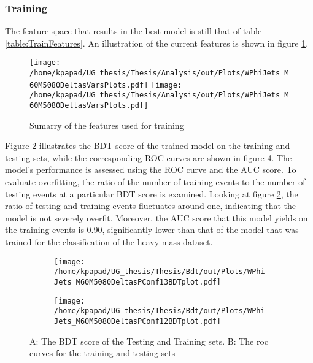 \subsubsection{Training}
\label{sec:org7ed8c8f}
\label{sec:Light:Training}
The feature space that results in the best model is still that of table \ref{table:TrainFeatures}. An illustration of the current features is shown in figure \ref{fig:LightFeatures}.
\begin{figure}[h]
\centering
\texttt{[image: /home/kpapad/UG\_thesis/Thesis/Analysis/out/Plots/WPhiJets\_M60M5080DeltasVarsPlots.pdf]}
\texttt{[image: /home/kpapad/UG\_thesis/Thesis/Analysis/out/Plots/WPhiJets\_M60M5080DeltasVarsPlots.pdf]}
\caption{Sumarry of the features used for training }
\label{fig:LightFeatures}
\end{figure}

Figure \ref{subfig:LightBdtPlot} illustrates the BDT score of the trained model on the training and testing sets, while the corresponding ROC curves are shown in figure \ref{subfig:LightROCCurves}. The model's performance is assessed using the ROC curve and the AUC score. To evaluate overfitting, the ratio of the number of training events to the number of testing events at a particular BDT score is examined. Looking at figure \ref{subfig:LightBdtPlot}, the ratio of testing and training events fluctuates around one, indicating that the model is not severely overfit. Moreover, the AUC score that this model yields on the training events is 0.90, significantly lower than that of the model that was trained for the classification of the heavy mass dataset.
\begin{figure}[h]
\centering
\begin{subfigure}{0.49\textwidth}
\centering
\texttt{[image: /home/kpapad/UG\_thesis/Thesis/Bdt/out/Plots/WPhiJets\_M60M5080DeltasPConf13BDTplot.pdf]}
\caption{}
\label{subfig:LightBdtPlot}
\end{subfigure}
\begin{subfigure}{0.49\textwidth}
\centering
\texttt{[image: /home/kpapad/UG\_thesis/Thesis/Bdt/out/Plots/WPhiJets\_M60M5080DeltasPConf12BDTplot.pdf]}
\caption{}
\label{subfig:LightROCCurves}
\end{subfigure}
\caption{A: The BDT score of the Testing and Training sets. B: The roc curves for the training and testing sets}
\end{figure}


